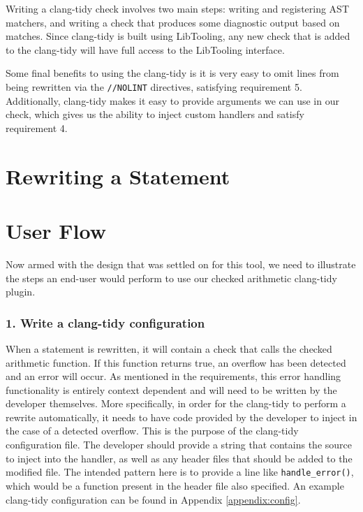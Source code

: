 Writing a clang-tidy check involves two main steps: writing and registering AST matchers, and writing a check that produces some diagnostic output based on matches. Since clang-tidy is built using LibTooling, any new check that is added to the clang-tidy will have full access to the LibTooling interface.

Some final benefits to using the clang-tidy is it is very easy to omit lines from being rewritten via the \texttt{//NOLINT} directives, satisfying requirement 5. Additionally, clang-tidy makes it easy to provide arguments we can use in our check, which gives us the ability to inject custom handlers and satisfy requirement 4.

\section{Rewriting a Statement}

\section{User Flow}

Now armed with the design that was settled on for this tool, we need to illustrate the steps an end-user would perform to use our checked arithmetic clang-tidy plugin.

\subsubsection{1. Write a clang-tidy configuration}

When a statement is rewritten, it will contain a check that calls the checked arithmetic function. If this function returns true, an overflow has been detected and an error will occur. As mentioned in the requirements, this error handling functionality is entirely context dependent and will need to be written by the developer themselves. More specifically, in order for the clang-tidy to perform a rewrite automatically, it needs to have code provided by the developer to inject in the case of a detected overflow. This is the purpose of the clang-tidy configuration file. The developer should provide a string that contains the source to inject into the handler, as well as any header files that should be added to the modified file. The intended pattern here is to provide a line like \texttt{handle\_error()}, which would be a function present in the header file also specified. An example clang-tidy configuration can be found in Appendix \ref{appendix:config}.

